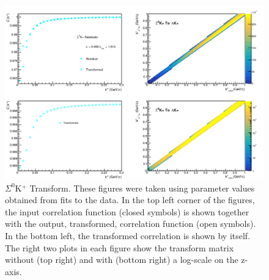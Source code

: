 \documentclass[/home/jesse/Analysis/FemtoAnalysis/AnalysisNotes/AnalysisNoteJBuxton.tex]{subfiles}
\begin{document}
\begin{figure}[h]
  \centering
  \includegraphics[width=\textwidth]{5_Fitting/Figures/Residuals_LamKchP_0010_Sig0KchP_MomResCrctn_NonFlatBgdCrctn_10Res_PrimMaxDecay4fm_UsingXiDataAndCoulombOnly.pdf}
  \caption[$\Sigma^{0}$K$^{+}$ Transform]{$\Sigma^{0}$K$^{+}$ Transform.  These figures were taken using parameter values obtained from fits to the data.  In the top left corner of the figures, the input correlation function (closed symbols) is shown together with the output, transformed, correlation function (open symbols).  In the bottom left, the transformed correlation is shown by itself.  The right two plots in each figure show the transform matrix without (top right) and with (bottom right) a log-scale on the z-axis.}
  \label{fig:Sig0KchPtoLamKchPTransform}
\end{figure}
\end{document}

